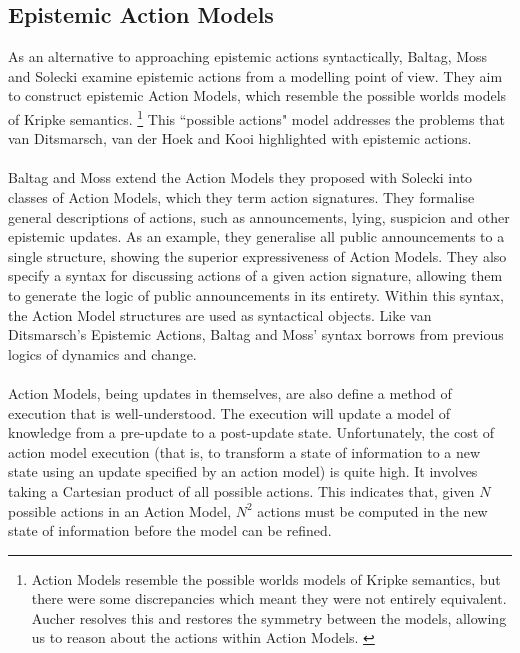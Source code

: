 \documentclass[12pt, a4paper, titlepage]{scrartcl}
\begin{document}
\subsection{Epistemic Action Models} \label{act_mods}
As an alternative to approaching epistemic actions syntactically, Baltag, Moss
and Solecki examine epistemic actions from a modelling point of view.
They aim to construct epistemic Action Models, which resemble the possible
worlds models of Kripke semantics. \citep{baltag1998lpa}
\footnote{Action Models resemble the possible worlds models of Kripke semantics,
but there were some discrepancies which meant they were not entirely equivalent.
Aucher resolves this and restores the symmetry between the models, allowing us
to reason about the actions within Action Models. \citep{aucher09revisited}}
This ``possible actions" model addresses the problems that van Ditsmarsch, van
der Hoek and Kooi highlighted with epistemic actions.\\
\\
Baltag and Moss extend the Action Models they proposed with Solecki into classes
of Action Models, which they term action signatures. \citep{baltag2005programs}
They formalise general descriptions of actions, such as announcements, lying,
suspicion and other epistemic updates.
As an example, they generalise all public announcements to a single structure,
showing the superior expressiveness of Action Models.
They also specify a syntax for discussing actions of a given action signature,
allowing them to generate the logic of public announcements in its entirety.
Within this syntax, the Action Model structures are used as syntactical objects.
Like van Ditsmarsch's Epistemic Actions, Baltag and Moss' syntax borrows from
previous logics of dynamics and change.\\
\\
Action Models, being updates in themselves, are also define a method of
execution that is well-understood.
The execution will update a model of knowledge from a pre-update to a
post-update state.
Unfortunately, the cost of action model execution (that is, to transform a state
of information to a new state using an update specified by an action model) is
quite high.
It involves taking a Cartesian product of all possible actions.
This indicates that, given $N$ possible actions in an Action Model, $N^2$
actions must be computed in the new state of information before the model can
be refined.
\end{document}
